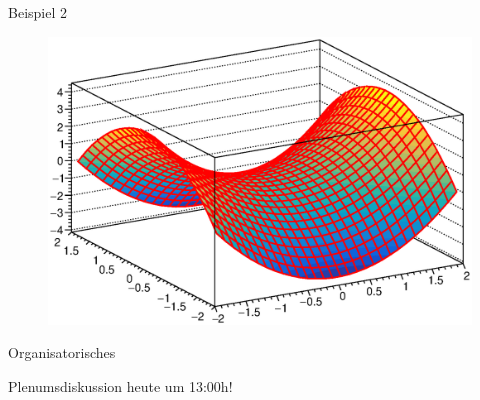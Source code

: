 \documentclass[german]{beamer}
\begin{document}
\begin{frame}{Beispiel 2}

\begin{figure}
\includegraphics[scale=0.5]{saddlepoint}
\end{figure}

\end{frame}


\begin{frame}{Organisatorisches}

\begin{center}
\alert{Plenumsdiskussion heute um 13:00h}!
\end{center}

\end{frame}

\begin{frame}

\end{frame}
\end{document}
